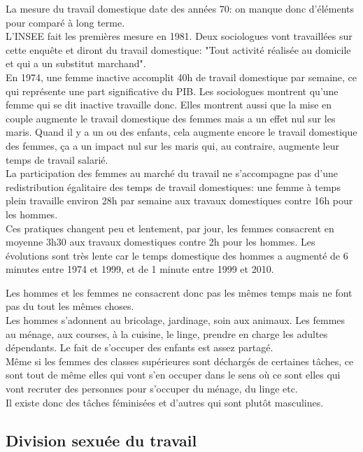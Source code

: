 \documentclass[10pt, a4paper, openany]{book}
\begin{document}
La mesure du travail domestique date des années 70: on manque donc d'éléments pour comparé à long terme. \\
L'INSEE fait les premières mesure en 1981. Deux sociologues vont travaillées sur cette enquête et diront du travail domestique: "Tout activité réalisée au domicile et qui a un substitut marchand".  \\
En 1974, une femme inactive accomplit 40h de travail domestique par semaine, ce qui représente une part significative du PIB. Les sociologues montrent qu'une femme qui se dit inactive travaille donc. Elles montrent aussi que la mise en couple augmente le travail domestique des femmes mais a un effet nul sur les maris. Quand il y a un ou des enfants, cela augmente encore le travail domestique des femmes, ça a un impact nul sur les maris qui, au contraire, augmente leur temps de travail salarié. \\
La participation des femmes au marché du travail ne s'accompagne pas d'une redistribution égalitaire des temps de travail domestiques: une femme à temps plein travaille environ 28h par semaine aux travaux domestiques contre 16h pour les hommes. \\
Ces pratiques changent peu et lentement, par jour, les femmes consacrent en moyenne 3h30 aux travaux domestiques contre 2h pour les hommes. Les évolutions sont très lente car le temps domestique des hommes a augmenté de 6 minutes entre 1974 et 1999, et de 1 minute entre 1999 et 2010. 


Les hommes et les femmes ne consacrent donc pas les mêmes temps mais ne font pas du tout les mêmes choses. \\
Les hommes s'adonnent au bricolage, jardinage, soin aux animaux. Les femmes au ménage, aux courses, à la cuisine, le linge, prendre en charge les adultes dépendants. Le fait de s'occuper des enfants est assez partagé. \\
Même si les femmes des classes supérieures sont déchargés de certaines tâches, ce sont tout de même elles qui vont s'en occuper dans le sens où ce sont elles qui vont recruter des personnes pour s'occuper du ménage, du linge etc. \\
Il existe donc des tâches féminisées et d'autres qui sont plutôt masculines. 

\subsection{Division sexuée du travail}
\end{document}
